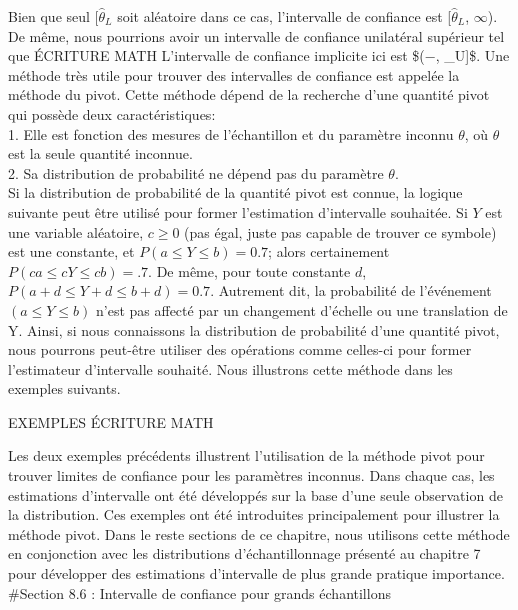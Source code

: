 \documentclass[]{article}
\begin{document}
Bien que seul {[}\(\widehat{\theta}_L\) soit aléatoire dans ce cas,
l'intervalle de confiance est {[}\(\widehat{\theta}_L\), \(\infty\)). De
même, nous pourrions avoir un intervalle de confiance unilatéral
supérieur tel que ÉCRITURE MATH L'intervalle de confiance implicite ici
est \$(−\infty, \widehat{\theta}\_U{]}\$. Une méthode très utile pour
trouver des intervalles de confiance est appelée la méthode du pivot.
Cette méthode dépend de la recherche d'une quantité pivot qui possède
deux caractéristiques:\\
1. Elle est fonction des mesures de l'échantillon et du paramètre
inconnu \(\theta\), où \(\theta\) est la seule quantité inconnue.\\
2. Sa distribution de probabilité ne dépend pas du paramètre
\(\theta\).\\
Si la distribution de probabilité de la quantité pivot est connue, la
logique suivante peut être utilisé pour former l'estimation d'intervalle
souhaitée. Si \(Y\) est une variable aléatoire, \(c \ge 0\) (pas égal,
juste pas capable de trouver ce symbole) est une constante, et
\(P(a \leq Y \leq b) = 0.7\); alors certainement
\(P(ca \leq cY \leq cb) = .7\). De même, pour toute constante \(d\),
\(P(a+d \leq Y+d \leq b+d) = 0.7\). Autrement dit, la probabilité de
l'événement \((a \leq Y \leq b)\) n'est pas affecté par un changement
d'échelle ou une translation de Y. Ainsi, si nous connaissons la
distribution de probabilité d'une quantité pivot, nous pourrons
peut-être utiliser des opérations comme celles-ci pour former
l'estimateur d'intervalle souhaité. Nous illustrons cette méthode dans
les exemples suivants.

EXEMPLES ÉCRITURE MATH

Les deux exemples précédents illustrent l'utilisation de la méthode
pivot pour trouver limites de confiance pour les paramètres inconnus.
Dans chaque cas, les estimations d'intervalle ont été développés sur la
base d'une seule observation de la distribution. Ces exemples ont été
introduites principalement pour illustrer la méthode pivot. Dans le
reste sections de ce chapitre, nous utilisons cette méthode en
conjonction avec les distributions d'échantillonnage présenté au
chapitre 7 pour développer des estimations d'intervalle de plus grande
pratique importance. \#Section 8.6 : Intervalle de confiance pour grands
échantillons
\end{document}
